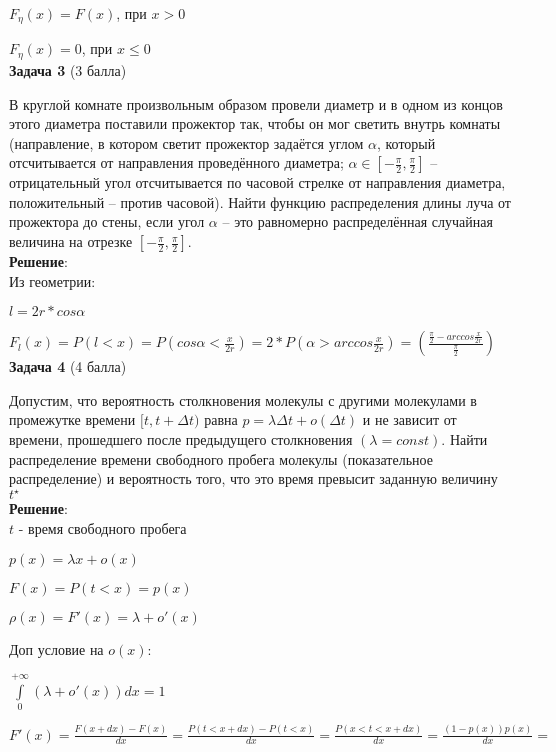 \documentclass{article}
\begin{document}
$F_{\eta}(x) = F(x)$, при $x > 0$

$F_{\eta}(x) = 0$, при $x \leq 0$\\

\textbf{Задача 3} (3 балла)

В круглой комнате произвольным образом провели диаметр и в одном из концов этого диаметра поставили прожектор так, чтобы он мог светить внутрь комнаты (направление, в котором светит прожектор задаётся углом $\alpha$, который отсчитывается от направления проведённого диаметра; $\alpha \in [-\frac{\pi}{2}, \frac{\pi}{2}]$ -- отрицательный угол отсчитывается  по часовой стрелке от направления диаметра, положительный -- против часовой). Найти функцию распределения длины луча от прожектора до стены, если угол $\alpha$ -- это равномерно распределённая случайная величина на отрезке $[-\frac{\pi}{2}, \frac{\pi}{2}]$.\\

\textbf{Решение}:\\

Из геометрии:

$l = 2r*cos\alpha$

$F_l(x) = P(l<x) = P(cos\alpha < \frac{x}{2r}) = 2*P(\alpha > arccos\frac{x}{2r}) = (\frac{\frac{\pi}{2} - arccos\frac{x}{2r}}{\frac{\pi}{2}})$\\

\textbf{Задача 4} (4 балла)

Допустим, что вероятность столкновения молекулы с другими молекулами в
промежутке времени $[t, t + \Delta t)$ равна $p = \lambda\Delta t+o(\Delta t)$ и не зависит от времени, прошедшего
после предыдущего столкновения $(\lambda = const)$. Найти распределение времени свободного
пробега молекулы (показательное распределение) и вероятность того, что это время превысит заданную величину $t^{\star}$\\

\textbf{Решение}:\\

$t$ - время свободного пробега

$p(x) = \lambda x+o(x)$

$F(x) = P(t<x) = p(x)$

$\rho(x) = F'(x) = \lambda + o'(x)$

Доп условие на $o(x)$:

$\int\limits^{+ \infty}_0(\lambda + o'(x))dx = 1$ 

$F'(x) = \frac{F(x+dx) - F(x)}{dx} = \frac{P(t < x+dx) - P(t < x)}{dx} = \frac{P(x < t < x+dx)}{dx} = \frac{(1-p(x))p(x)}{dx} =$
\end{document}
